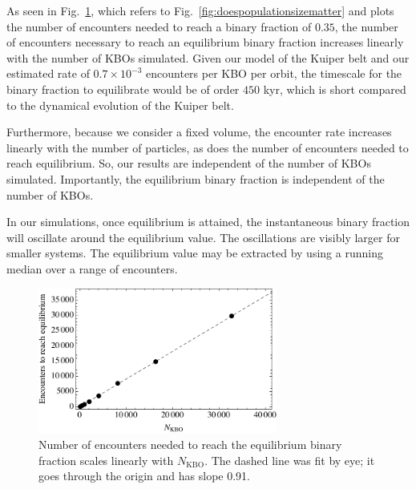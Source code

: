 \documentclass[a4paper,12pt]{article}
\begin{document}
As seen in Fig.~\ref{fig:encountersneededtoreachequilibrium}, which refers to Fig.~\ref{fig:doespopulationsizematter} and plots the number of encounters needed to reach a binary fraction of $0.35$, the number of encounters necessary to reach an equilibrium binary fraction increases linearly with the number of KBOs simulated.  Given our model of the Kuiper belt and our estimated rate of $0.7\times 10^{-3}$ encounters per KBO per orbit, the timescale for the binary fraction to equilibrate would be of order $450$ kyr, which is short compared to the dynamical evolution of the Kuiper belt.

Furthermore, because we consider a fixed volume, the encounter rate increases linearly with the number of particles, as does the number of encounters needed to reach equilibrium.  So, our results are independent of the number of KBOs simulated.  Importantly, the equilibrium binary fraction is independent of the number of KBOs.

In our simulations, once equilibrium is attained, the instantaneous binary fraction will oscillate around the equilibrium value.  The oscillations are visibly larger for smaller systems.  The equilibrium value may be extracted by using a running median over a range of encounters.

\begin{figure}
\centering
\includegraphics[width=0.7\textwidth]{EncountersNeededToReachEquilibrium}
\caption{\label{fig:encountersneededtoreachequilibrium}
Number of encounters needed to reach the equilibrium binary fraction scales linearly with $N_\text{KBO}$. The dashed line was fit by eye; it goes through the origin and has slope 0.91.}
\end{figure}
\end{document}
